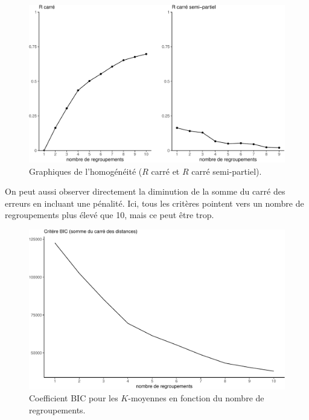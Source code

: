 \documentclass[
  11pt,
  letterpaper,
]{book}
\theoremstyle{definition}
\theoremstyle{remark}
\begin{document}
\begin{figure}[ht!]

{\centering \includegraphics[width=1\textwidth,height=\textheight]{./03-regroupements_files/figure-pdf/fig-homogeneite-1.pdf}

}

\caption{\label{fig-homogeneite}Graphiques de l'homogénéité (\(R\) carré
et \(R\) carré semi-partiel).}

\end{figure}

On peut aussi observer directement la diminution de la somme du carré
des erreurs en incluant une pénalité. Ici, tous les critères pointent
vers un nombre de regroupements plus élevé que 10, mais ce peut être
trop.

\begin{figure}[ht!]

{\centering \includegraphics[width=1\textwidth,height=\textheight]{./03-regroupements_files/figure-pdf/fig-bickmoy-1.pdf}

}

\caption{\label{fig-bickmoy}Coefficient BIC pour les \(K\)-moyennes en
fonction du nombre de regroupements.}

\end{figure}
\end{document}
